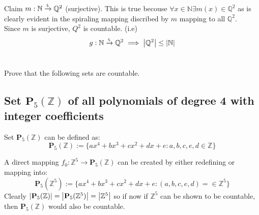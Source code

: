\documentclass[]{article}
\newcommand{\N}{\mathbb{N}}
\newcommand{\Z}{\mathbb{Z}}
\newcommand{\Q}{\mathbb{Q}}
\newcommand{\toS}{\xrightarrow{\textsf{\tiny S}}}
\begin{document}
Claim $m : \N \toS \Q^2$ (surjective).
This is true becouse $\forall x \in \N \exists m(x) \in \Q^2$ as is 
clearly evident in the spiraling mapping discribed by $m$ mapping to all $\Q^2$.\\

Since $m$ is surjective, $Q^2$ is countable. (i.e)
$$g : \N \toS \Q^2 \implies \abs{\Q^2} \leq \abs{\N}$$


\newpage
\section{}
Prove that the following sets are countable.

\subsection{Set $\mathbf{P}_5(\Z)$ of all polynomials of degree 4 with integer coefficients}

Set $\mathbf{P}_5(\Z)$ can be defined as:
\begin{displaymath}
	\mathbf{P}_5(\Z) := \{ax^4 + bx^3 + cx^2 + dx + e : a,b,c,e,d \in \Z\}
\end{displaymath}

A direct mapping $f_0 : \Z^5 \to \mathbf{P}_5(\Z)$ can be created by either redefining 
or mapping into:
\begin{displaymath}
	\mathbf{P}_5(\Z^5) := \{ax^4 + bx^3 + cx^2 + dx + e : (a,b,c,e,d) = \in \Z^5\}
\end{displaymath}
Clearly $\abs{\mathbf{P}_5(\Z)} = \abs{\mathbf{P}_5(\Z^5)} = \abs{\Z^5}$ so if now if 
$\Z^5$ can be shown to be countable, then $\mathbf{P}_5(\Z)$ would also be countable.\\
\end{document}
